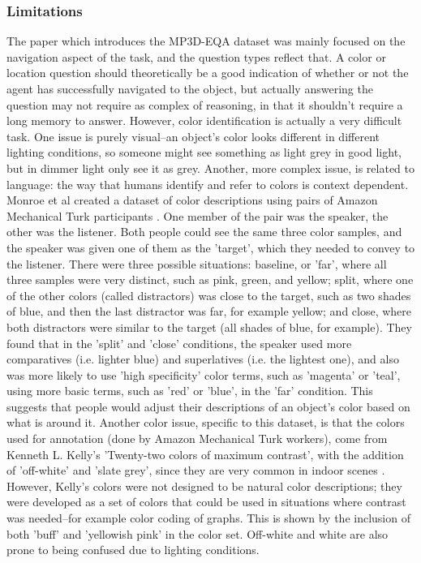 \subsubsection{Limitations}
The paper which introduces the MP3D-EQA dataset was mainly focused on the navigation aspect of the task, and the question types reflect that. A color or location question should theoretically be a good indication of whether or not the agent has successfully navigated to the object, but actually answering the question may not require as complex of reasoning, in that it shouldn't require a long memory to answer. \newline
However, color identification is actually a very difficult task. One issue is purely visual--an object's color looks different in different lighting conditions, so someone might see something as light grey in good light, but in dimmer light only see it as grey. Another, more complex issue, is related to language: the way that humans identify and refer to colors is context dependent. Monroe et al created a dataset of color descriptions using pairs of Amazon Mechanical Turk participants \cite{colorsincontext}. One member of the pair was the speaker, the other was the listener. Both people could see the same three color samples, and the speaker was given one of them as the 'target', which they needed to convey to the listener. There were three possible situations: baseline, or 'far', where all three samples were very distinct, such as pink, green, and yellow; split, where one of the other colors (called distractors) was close to the target, such as two shades of blue, and then the last distractor was far, for example yellow; and close, where both distractors were similar to the target (all shades of blue, for example). They found that in the 'split' and 'close' conditions, the speaker used more comparatives (i.e. lighter blue) and superlatives (i.e. the lightest one), and also was more likely to use 'high specificity' color terms, such as 'magenta' or 'teal', using more basic terms, such as 'red' or 'blue', in the 'far' condition. This suggests that people would adjust their descriptions of an object's color based on what is around it. Another color issue, specific to this dataset, is that the colors used for annotation (done by Amazon Mechanical Turk workers), come from Kenneth L. Kelly's 'Twenty-two colors of maximum contrast', with the addition of 'off-white' and 'slate grey', since they are very common in indoor scenes \cite{kellycolors}. However, Kelly's colors were not designed to be natural color descriptions; they were developed as a set of colors that could be used in situations where contrast was needed--for example color coding of graphs. This is shown by the inclusion of both 'buff' and 'yellowish pink' in the color set. Off-white and white are also prone to being confused due to lighting conditions.\newline

